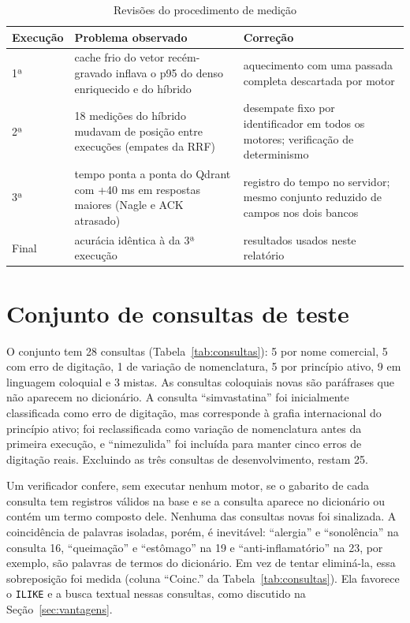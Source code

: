 \documentclass[12pt,oneside,a4paper,english,brazil]{abntex2}
\newcommand{\campo}[1]{\texttt{#1}}
\begin{document}
\begin{table}[htb]
  \centering
  \caption{Revisões do procedimento de medição}
  \label{tab:revisoes}
  \footnotesize
  \begin{tabular}{|p{1.9cm}|p{5.6cm}|p{6.3cm}|}
    \hline
    \textbf{Execução} & \textbf{Problema observado} & \textbf{Correção} \\ \hline
    1ª & cache frio do vetor recém-gravado inflava o p95 do denso enriquecido e do híbrido & aquecimento com uma passada completa descartada por motor \\ \hline
    2ª & 18 medições do híbrido mudavam de posição entre execuções (empates da RRF) & desempate fixo por identificador em todos os motores; verificação de determinismo \\ \hline
    3ª & tempo ponta a ponta do Qdrant com +40 ms em respostas maiores (Nagle e ACK atrasado) & registro do tempo no servidor; mesmo conjunto reduzido de campos nos dois bancos \\ \hline
    Final & acurácia idêntica à da 3ª execução & resultados usados neste relatório \\ \hline
  \end{tabular}
\end{table}

\section{Conjunto de consultas de teste}
\label{sec:consultas}

O conjunto tem 28 consultas (Tabela~\ref{tab:consultas}): 5 por nome comercial, 5 com erro de digitação, 1 de variação de nomenclatura, 5 por princípio ativo, 9 em linguagem coloquial e 3 mistas. As consultas coloquiais novas são paráfrases que não aparecem no dicionário. A consulta ``simvastatina'' foi inicialmente classificada como erro de digitação, mas corresponde à grafia internacional do princípio ativo; foi reclassificada como variação de nomenclatura antes da primeira execução, e ``nimezulida'' foi incluída para manter cinco erros de digitação reais. Excluindo as três consultas de desenvolvimento, restam 25.

Um verificador confere, sem executar nenhum motor, se o gabarito de cada consulta tem registros válidos na base e se a consulta aparece no dicionário ou contém um termo composto dele. Nenhuma das consultas novas foi sinalizada. A coincidência de palavras isoladas, porém, é inevitável: ``alergia'' e ``sonolência'' na consulta 16, ``queimação'' e ``estômago'' na 19 e ``anti-inflamatório'' na 23, por exemplo, são palavras de termos do dicionário. Em vez de tentar eliminá-la, essa sobreposição foi medida (coluna ``Coinc.'' da Tabela~\ref{tab:consultas}). Ela favorece o \campo{ILIKE} e a busca textual nessas consultas, como discutido na Seção~\ref{sec:vantagens}.
\end{document}
